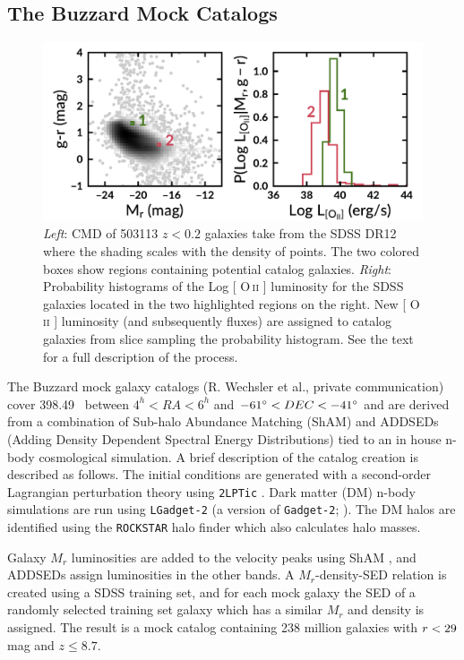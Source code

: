 \documentclass[fleqn,usenatbib]{mnras}
\makeatletter
\DeclareRobustCommand{\ion}[2]{%
\relax\ifmmode
\ifx\testbx\f@series
{\mathbf{#1\,\mathsc{#2}}}\else
{\mathrm{#1\,\mathsc{#2}}}\fi
\else\textup{#1\,{\mdseries\textsc{#2}}}%
\fi}
\makeatother
\begin{document}
\subsection{The Buzzard Mock Catalogs}
\begin{figure} 
	\includegraphics[width=\textwidth]{figures/oii_sdss.pdf} 
	\caption{\textit{Left}: CMD of 503113 $z<0.2$ galaxies take from the SDSS DR12 where the shading scales with the density of points. The two colored boxes show regions containing potential catalog galaxies. \textit{Right}: Probability histograms of the Log [\ion{O}{ii}] luminosity for the SDSS galaxies located in the two highlighted regions on the right. New [\ion{O}{ii}] luminosity (and subsequently fluxes) are assigned to catalog galaxies from slice sampling the probability histogram. See the text for a full description of the process.} \label{fig: oii sdss} 
\end{figure}

The Buzzard mock galaxy catalogs (R. Wechsler et al., private communication) cover 398.49 \degsq\ between $4^h< RA < 6^h$ and $-61\hbox{$^\circ$} < DEC < -41\hbox{$^\circ$}$ and are derived from a combination of Sub-halo Abundance Matching (ShAM) and ADDSEDs (Adding Density Dependent Spectral Energy Distributions) tied to an in house n-body cosmological simulation. A brief description of the catalog creation is described as follows. The initial conditions are generated with a second-order Lagrangian perturbation theory using {\tt 2LPTic} \citep{Crocce2006}. Dark matter (DM) n-body simulations are run using {\tt LGadget-2} (a version of {\tt Gadget-2}; \citealt{Springel2005}). The DM halos are identified using the {\tt ROCKSTAR} halo finder \citep{Behroozi2013} which also calculates halo masses. 

Galaxy $M_r$ luminosities are added to the velocity peaks using ShAM \citep{Reddick2013}, and ADDSEDs assign luminosities in the other bands. A $M_r$-density-SED relation is created using a SDSS training set, and for each mock galaxy the SED of a randomly selected training set galaxy which has a similar $M_r$ and density is assigned. The result is a mock catalog containing 238 million galaxies with $\hbox{$r$} < 29$ mag and $z \leq 8.7$.
\end{document}
